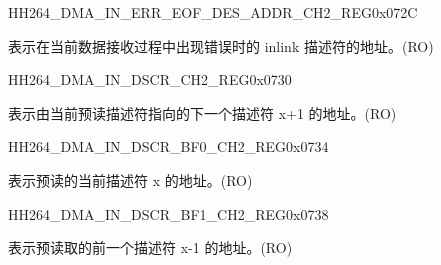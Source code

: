 \begin{register}{H}{H264\_DMA\_IN\_ERR\_EOF\_DES\_ADDR\_CH2\_REG}{0x072C}\label{regdesc:H264DMAINERREOFDESADDRCH2REG}
%
\regnewline%
\begin{regdesc}\begin{reglist}
\label{fielddesc:H264DMAINERREOFDESADDRCH2}\item [H264\_DMA\_IN\_ERR\_EOF\_DES\_ADDR\_CH2] 表示在当前数据接收过程中出现错误时的 inlink 描述符的地址。(RO)
\end{reglist}\end{regdesc}
\end{register}


\begin{register}{H}{H264\_DMA\_IN\_DSCR\_CH2\_REG}{0x0730}\label{regdesc:H264DMAINDSCRCH2REG}
%
\regnewline%
\begin{regdesc}\begin{reglist}
\label{fielddesc:H264DMAINLINKDSCRCH2}\item [H264\_DMA\_INLINK\_DSCR\_CH2] 表示由当前预读描述符指向的下一个描述符 x+1 的地址。(RO)
\end{reglist}\end{regdesc}
\end{register}


\begin{register}{H}{H264\_DMA\_IN\_DSCR\_BF0\_CH2\_REG}{0x0734}\label{regdesc:H264DMAINDSCRBF0CH2REG}
%
\regnewline%
\begin{regdesc}\begin{reglist}
\label{fielddesc:H264DMAINLINKDSCRBF0CH2}\item [H264\_DMA\_INLINK\_DSCR\_BF0\_CH2] 表示预读的当前描述符 x 的地址。(RO)
\end{reglist}\end{regdesc}
\end{register}


\begin{register}{H}{H264\_DMA\_IN\_DSCR\_BF1\_CH2\_REG}{0x0738}\label{regdesc:H264DMAINDSCRBF1CH2REG}
%
\regnewline%
\begin{regdesc}\begin{reglist}
\label{fielddesc:H264DMAINLINKDSCRBF1CH2}\item [H264\_DMA\_INLINK\_DSCR\_BF1\_CH2] 表示预读取的前一个描述符 x-1 的地址。(RO)
\end{reglist}\end{regdesc}
\end{register}

